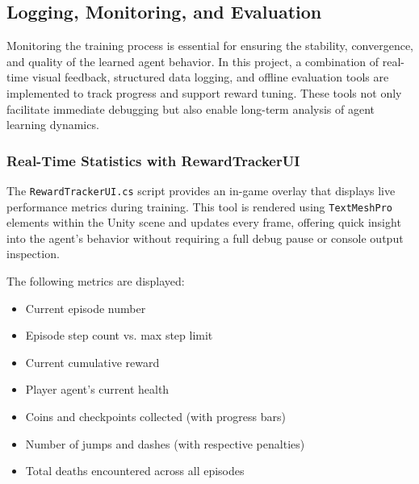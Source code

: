 \documentclass[12pt,oneside,openright,a4paper]{cpe-english-project}
\begin{document}




\subsection{Logging, Monitoring, and Evaluation}
Monitoring the training process is essential for ensuring the stability, convergence, and quality of the learned agent behavior. In this project, a combination of real-time visual feedback, structured data logging, and offline evaluation tools are implemented to track progress and support reward tuning. These tools not only facilitate immediate debugging but also enable long-term analysis of agent learning dynamics.

\subsubsection{Real-Time Statistics with RewardTrackerUI}

The \texttt{RewardTrackerUI.cs} script provides an in-game overlay that displays live performance metrics during training. This tool is rendered using \texttt{TextMeshPro }elements within the Unity scene and updates every frame, offering quick insight into the agent's behavior without requiring a full debug pause or console output inspection.

The following metrics are displayed:

\begin{itemize}
\item Current episode number
\item Episode step count vs. max step limit
\item Current cumulative reward
\item Player agent’s current health
\item Coins and checkpoints collected (with progress bars)
\item Number of jumps and dashes (with respective penalties)
\item Total deaths encountered across all episodes
\end{itemize}
\end{document}
